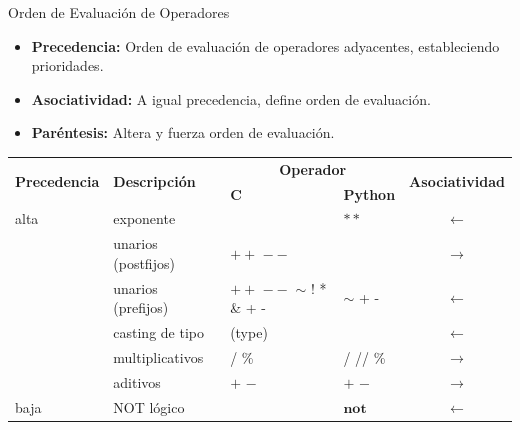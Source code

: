 \documentclass{beamer}
\begin{document}
\begin{frame}[fragile]{Orden de Evaluación de Operadores}
\begin{itemize}
	\footnotesize
	\item \textbf{Precedencia:} Orden de evaluación de operadores adyacentes, estableciendo prioridades.
	\item \textbf{Asociatividad:} A igual precedencia, define orden de evaluación.
	\item \textbf{Paréntesis:} Altera y fuerza orden de evaluación.
\end{itemize}

\scriptsize
\renewcommand{\tabcolsep}{.1cm}
\begin{tabular}{|l|l||l|l|c|}\hline 
	\multirow{2}{*}{\textbf{Precedencia}}  & \multirow{2}{*}{\textbf{Descripción}} & 
	\multicolumn{2}{|c|}{\textbf{Operador}} & \multirow{2}{*}{\textbf{Asociatividad}} \\ \hhline{~~--~}
	& & \textbf{C} & \textbf{Python} &  \\ \hline \hline
	alta & exponente &  & $**$ & $\leftarrow$  \\	\hline
	& unarios (postfijos) & \tiny $++$ $--$ &  & $\rightarrow$ \\	\hline
	& unarios (prefijos) & \tiny$++$ $--$ $\sim$ ! * \& + - & \tiny $\sim$ + - & $\leftarrow$ \\	\hline
	& casting de tipo &(type) & & $\leftarrow$ \\	\hline
	& multiplicativos & \tiny * / \% & \tiny * / // \%	 & $\rightarrow$  \\	\hline
	& aditivos & \tiny $+$ $-$ & \tiny $+$ $-$ & $\rightarrow$  \\	\hline
	baja & NOT lógico  &	& $\mathbf{not}$ & $\leftarrow$ \\	\hline
\end{tabular}
\end{frame}
\end{document}
